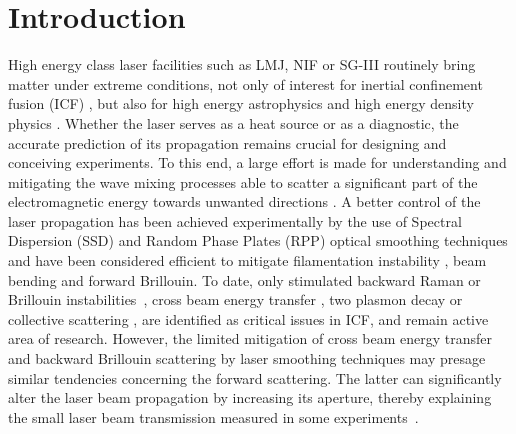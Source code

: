 \documentclass[
 reprint,
 superscriptaddress,
 amsmath,amssymb,
 aps,
]{revtex4-1}
\begin{document}
\section{Introduction}
High energy class laser facilities such as LMJ,  NIF or SG-III routinely bring matter under extreme conditions, not only of interest for inertial confinement fusion (ICF) \cite{Cavailler_2005,Lindl_2004,MRE_Zheng_2017}, but also for high energy astrophysics  and high energy density physics   \cite{Drake2006}. 
Whether the laser serves as a heat source or as a diagnostic, the accurate prediction of its propagation remains crucial for designing and  conceiving experiments. 
To this end, a large effort is made for understanding and mitigating the wave mixing processes able to scatter a significant part of the electromagnetic energy towards unwanted directions \cite[]{Shen_1965,Forslund_1973}. A better control of the laser propagation has been achieved experimentally by the use of Spectral Dispersion (SSD) and  Random Phase Plates (RPP) optical smoothing techniques\cite[]{Kato_1984,Skupski_1989,NatPhys_Glenzer,NatPhys_Labaune} and have been considered efficient to mitigate filamentation instability \cite[]{phd_Michel,POP_Michel_2003,Lushnikov_2006,PRL_Sarri_2011}, beam bending\cite[]{PRL_Hinkel_1996,
POP_Bezzerides_1998,PRL_Young_1998,POP_Ruyer_2020} and forward Brillouin.
To date, only stimulated backward Raman or Brillouin instabilities~\cite{POP_Liu_2009,hao_2013},  cross beam energy transfer \cite{hao_2016}, two plasmon decay \cite[]{Dubois_1995,Russell_2001} or collective scattering  \cite[]{PRL_Neuville_2016,PRL_Depierreux_2016}, are identified as critical issues in ICF, and remain active area of research. However, the limited mitigation of cross beam energy transfer~\cite{PRL_Neuville_2016cbet} and backward Brillouin scattering by laser smoothing techniques may presage similar tendencies concerning the forward scattering. %
The latter can significantly alter the laser beam propagation by increasing its aperture, thereby explaining the small laser beam transmission measured in some experiments~\cite{POP_Rousseaux_2015}.
 
\end{document}
